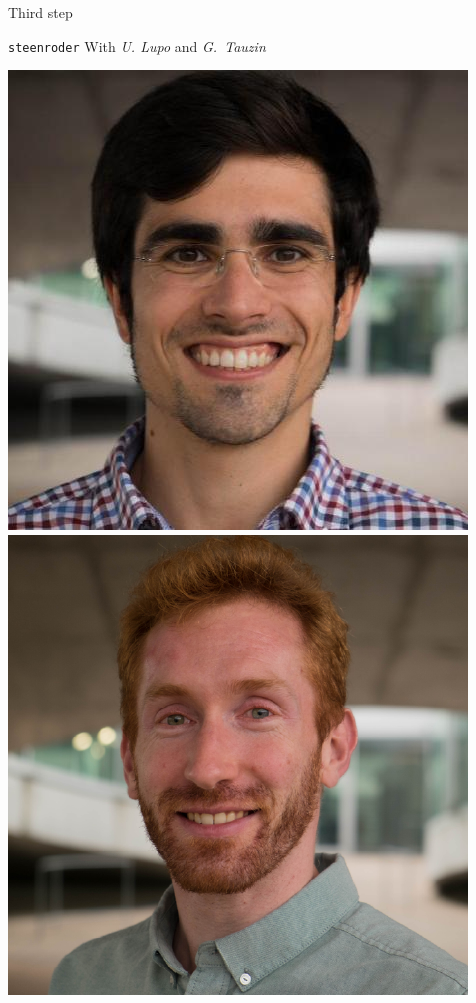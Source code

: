 \begin{frame}{Third step}
	
\end{frame}

\begin{frame}{\texttt{steenroder}}
	\pause
	With \textit{U. Lupo} and \textit{G.~Tauzin}

	\begin{center}
		\includegraphics[scale=.2]{aux/umberto}
		\qquad
		\includegraphics[scale=.2]{aux/guillaume}
	\end{center}


\end{frame}

